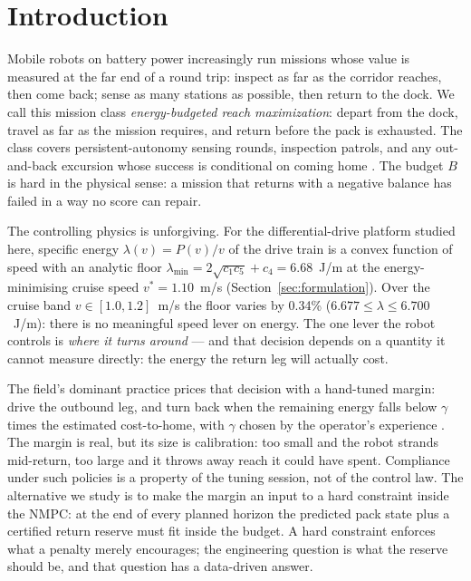 \documentclass[preprint,12pt]{elsarticle}
\begin{document}
\section{Introduction}
Mobile robots on battery power increasingly run
missions whose value is measured at the far end of a round trip:
inspect as far as the corridor reaches, then come back; sense as many
stations as possible, then return to the dock. We call this mission
class \emph{energy-budgeted reach maximization}: depart from the dock,
travel as far as the mission requires, and return before the pack is
exhausted. The class covers persistent-autonomy sensing rounds,
inspection patrols, and any out-and-back excursion whose success is
conditional on coming home \cite{notomista2021persistification,
huang2015adaptive}. The budget $B$ is hard in the physical sense: a
mission that returns with a negative balance has failed in a way no
score can repair.

The controlling physics is unforgiving. For the differential-drive
platform studied here, specific energy
$\lambda(v) = P(v)/v$ of the drive train is a convex function of speed
with an analytic floor $\lambda_{\min} = 2\sqrt{c_1 c_5} + c_4 =
6.68$~J/m at the energy-minimising cruise speed $v^{*} = 1.10$~m/s
(Section~\ref{sec:formulation}). Over the cruise band
$v \in [1.0, 1.2]$~m/s the floor varies by 0.34\%
($6.677 \le \lambda \le 6.700$~J/m): there is no meaningful speed lever
on energy. The one lever the robot controls is \emph{where it turns
around} --- and that decision depends on a quantity it cannot measure
directly: the energy the return leg will actually cost.

The field's dominant practice prices that decision with a hand-tuned
margin: drive the outbound leg, and turn back when the remaining
energy falls below $\gamma$ times the estimated cost-to-home, with
$\gamma$ chosen by the operator's experience
\cite{huang2015adaptive, li2026robust}. The margin is real, but its
size is calibration: too small and the robot strands mid-return, too
large and it throws away reach it could have spent. Compliance under
such policies is a property of the tuning session, not of the control
law. The alternative we study is to make the margin an input to a hard
constraint inside the NMPC: at the end of every planned horizon the
predicted pack state plus a certified return reserve must fit inside
the budget. A hard constraint enforces what a penalty merely
encourages; the engineering question is what the reserve should be,
and that question has a data-driven answer.
\end{document}
